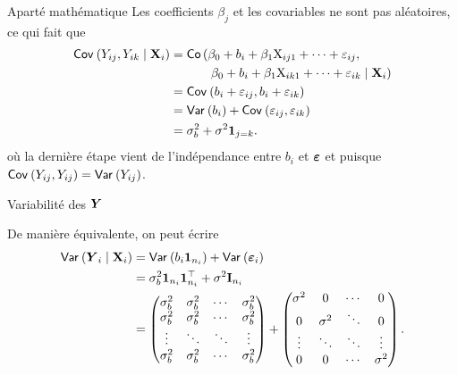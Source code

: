 \documentclass{beamer}
\begin{document}
\begin{frame}{Aparté mathématique}
Les coefficients $\beta_j$ et les covariables ne sont pas aléatoires, ce qui fait que
 \begin{align*}
  {\mathsf{Cov}_{}}\left(Y_{ij}, Y_{ik} \mid \mathbf{X}_i\right) &= \mathsf{Co}\left(\beta_0 +b_i + \beta_1\mathrm{X}_{ij1}+\cdots + \varepsilon_{ij},\right.\\
  & \quad \qquad \left.\beta_0 +b_i + \beta_1\mathrm{X}_{ik1}+\cdots + \varepsilon_{ik} \mid \mathbf{X}_i\right)
  \\&= {\mathsf{Cov}_{}}\left(b_i+ \varepsilon_{ij}, b_i + \varepsilon_{ik}\right)
  \\&= {\mathsf{Var}_{}}\left(b_i\right) + {\mathsf{Cov}_{}}\left(\varepsilon_{ij}, \varepsilon_{ik}\right) \\&= \sigma^2_b +\sigma^2{\mathbf 1}_{j=k}.
\end{align*}
où la dernière étape vient de l'indépendance entre $b_i$ et $\boldsymbol {\varepsilon}$ et puisque ${\mathsf{Cov}_{}}\left(Y_{ij},Y_{ij}\right)={\mathsf{Var}_{}}\left(Y_{ij}\right)$.

\end{frame}
\begin{frame}{Variabilité des $\boldsymbol {Y}$}


De manière équivalente, on peut écrire
\begin{align*}
   {\mathsf{Var}_{}}\left(\boldsymbol {Y}_i \mid \mathbf{X}_i\right) &= {\mathsf{Var}_{}}\left(b_i \boldsymbol {1}_{n_i}\right) + {\mathsf{Var}_{}}\left(\boldsymbol {\varepsilon}_i\right)
   \\&= \sigma^2_b \boldsymbol {1}_{n_i}\boldsymbol {1}_{n_i}^\top + \sigma^2 \mathbf{I}_{n_i}
   \\&= 
   \begin{pmatrix}
 \sigma^2_b &  \sigma^2_b & \cdots & \sigma^2_b \\
  \sigma^2_b &  \sigma^2_b & \cdots & \sigma^2_b \\
 \vdots & \ddots & \ddots & \vdots \\
 \sigma^2_b &  \sigma^2_b & \cdots & \sigma^2_b   
 \end{pmatrix} + \begin{pmatrix}
 \sigma^2 & 0 & \cdots &0\\
 0 & \sigma^2 & \ddots &0\\
 \vdots &\ddots & \ddots & \vdots\\
 0 & 0 & \cdots & \sigma^2
 \end{pmatrix}.
\end{align*}

\end{frame}
\end{document}
